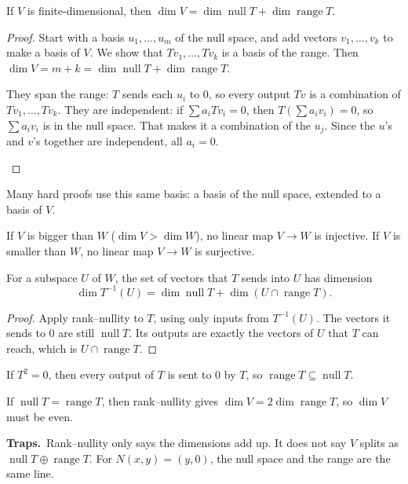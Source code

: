 \documentclass[11pt]{scrartcl}
\DeclareMathOperator{\nul}{null}
\DeclareMathOperator{\range}{range}
\newcommand{\traps}{\par\medskip\noindent\textbf{\color{RawSienna}Traps.}\ }
\begin{document}
\begin{theorem*}
  If $V$ is finite-dimensional, then $\dim V=\dim\nul T+\dim\range T$.
\end{theorem*}
\begin{proof}
  Start with a basis $u_1,\dots,u_m$ of the null space, and add vectors $v_1,\dots,v_k$ to make a basis of $V$.
  We show that $Tv_1,\dots,Tv_k$ is a basis of the range. Then $\dim V=m+k=\dim\nul T+\dim\range T$.
  \begin{itemize}
    \ii They span the range: $T$ sends each $u_i$ to $0$, so every output $Tv$ is a combination of $Tv_1,\dots,Tv_k$.
    \ii They are independent: if $\sum a_iTv_i=0$, then $T(\sum a_iv_i)=0$, so $\sum a_iv_i$ is in the null space. That makes it a combination of the $u_j$. Since the $u$'s and $v$'s together are independent, all $a_i=0$.
  \end{itemize}
\end{proof}
Many hard proofs use this same basis: a basis of the null space, extended to a basis of $V$.

\begin{corollary*}
  If $V$ is bigger than $W$ ($\dim V>\dim W$), no linear map $V\to W$ is injective.
  If $V$ is smaller than $W$, no linear map $V\to W$ is surjective.
\end{corollary*}

\begin{proposition*}
  For a subspace $U$ of $W$, the set of vectors that $T$ sends into $U$ has dimension
  \[ \dim T^{-1}(U)=\dim\nul T+\dim(U\cap\range T). \]
\end{proposition*}
\begin{proof}
  Apply rank--nullity to $T$, using only inputs from $T^{-1}(U)$.
  The vectors it sends to $0$ are still $\nul T$.
  Its outputs are exactly the vectors of $U$ that $T$ can reach, which is $U\cap\range T$.
\end{proof}

\begin{proposition*}[HW3 P2]
  If $T^2=0$, then every output of $T$ is sent to $0$ by $T$, so $\range T\subseteq\nul T$.

  If $\nul T=\range T$, then rank--nullity gives $\dim V=2\dim\range T$, so $\dim V$ must be even.
\end{proposition*}

\traps Rank--nullity only says the dimensions add up. It does not say $V$ splits as $\nul T\oplus\range T$. For $N(x,y)=(y,0)$, the null space and the range are the same line.
\end{document}
